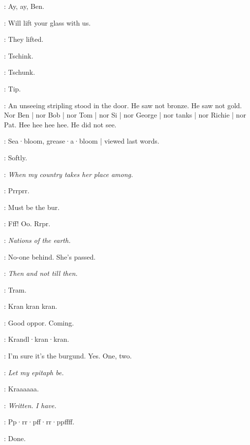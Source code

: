 \simon:
Ay,
ay,
Ben.

\dollard:
Will lift your glass with us.

:
They lifted.


:
Tschink.

:
Tschunk.

\stripling:
Tip.

:
An unseeing stripling stood in the door.
He saw not bronze.
He saw not gold.
Nor Ben |
nor Bob |
nor Tom |
nor Si |
nor George |
nor tanks |
nor Richie |
nor Pat.
Hee hee hee hee.
He did not see.

:
Sea·bloom,
grease·a·bloom |
viewed last words.

\BloomInt:
Softly.

\emmet:
\emph{When my country takes her place among.}

:
Prrprr.

\BloomInt:
Must be the bur.

:
Fff!
Oo.
Rrpr.

\emmet:
\emph{Nations of the earth.}

\BloomInt:
No-one behind.
She's passed.

\emmet:
\emph{Then and not till then.}

\BloomInt:
Tram.

:
Kran kran kran.

\BloomInt:
Good oppor.
Coming.

:
Krandl·kran·kran.

\BloomInt:
I'm sure it's the burgund.
Yes.
One,
two.

\emmet:
\emph{Let my epitaph be.}

:
Kraaaaaa.

\emmet:
\emph{Written.
I have.}

:
Pp·rr·pff·rr·ppffff.

\BloomInt:
Done.
